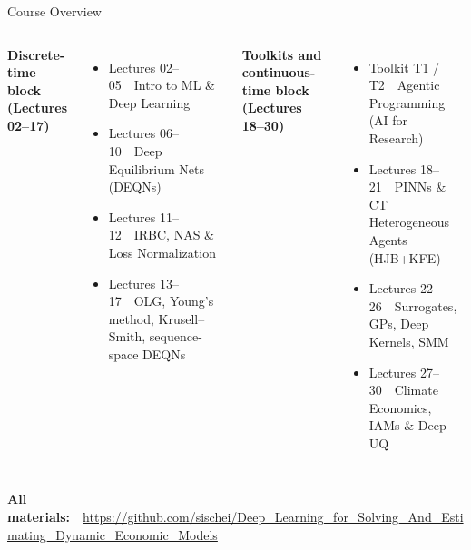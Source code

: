 \documentclass[aspectratio=169,11pt]{beamer}
\begin{document}
\begin{frame}{Course Overview}
\footnotesize
\begin{columns}[T]
\textbf{Discrete-time block (Lectures 02--17)}
\begin{itemize}
    \item Lectures 02--05~~Intro to ML \& Deep Learning
    \item Lectures 06--10~~Deep Equilibrium Nets (DEQNs)
    \item Lectures 11--12~~IRBC, NAS \& Loss Normalization
    \item Lectures 13--17~~OLG, Young's method, Krusell--Smith, sequence-space DEQNs
\end{itemize}

\textbf{Toolkits and continuous-time block (Lectures 18--30)}
\begin{itemize}
    \item Toolkit T1 / T2~~Agentic Programming (AI for Research)
    \item Lectures 18--21~~PINNs \& CT Heterogeneous Agents (HJB+KFE)
    \item Lectures 22--26~~Surrogates, GPs, Deep Kernels, SMM
    \item Lectures 27--30~~Climate Economics, IAMs \& Deep UQ
\end{itemize}
\end{columns}
\normalsize

\vspace{0.6cm}
\begin{center}
\textbf{All materials:}~~\url{https://github.com/sischei/Deep_Learning_for_Solving_And_Estimating_Dynamic_Economic_Models}\\[4pt]
\end{center}
\end{frame}
\end{document}
